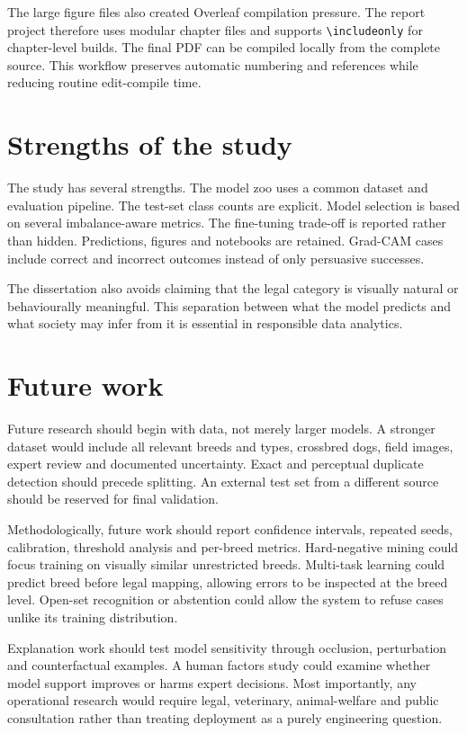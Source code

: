 The large figure files also created Overleaf compilation pressure. The report project therefore uses modular chapter files and supports \texttt{\textbackslash includeonly} for chapter-level builds. The final PDF can be compiled locally from the complete source. This workflow preserves automatic numbering and references while reducing routine edit-compile time.

\section{Strengths of the study}
The study has several strengths. The model zoo uses a common dataset and evaluation pipeline. The test-set class counts are explicit. Model selection is based on several imbalance-aware metrics. The fine-tuning trade-off is reported rather than hidden. Predictions, figures and notebooks are retained. Grad-CAM cases include correct and incorrect outcomes instead of only persuasive successes.

The dissertation also avoids claiming that the legal category is visually natural or behaviourally meaningful. This separation between what the model predicts and what society may infer from it is essential in responsible data analytics.

\section{Future work}
Future research should begin with data, not merely larger models. A stronger dataset would include all relevant breeds and types, crossbred dogs, field images, expert review and documented uncertainty. Exact and perceptual duplicate detection should precede splitting. An external test set from a different source should be reserved for final validation.

Methodologically, future work should report confidence intervals, repeated seeds, calibration, threshold analysis and per-breed metrics. Hard-negative mining could focus training on visually similar unrestricted breeds. Multi-task learning could predict breed before legal mapping, allowing errors to be inspected at the breed level. Open-set recognition or abstention could allow the system to refuse cases unlike its training distribution.

Explanation work should test model sensitivity through occlusion, perturbation and counterfactual examples. A human factors study could examine whether model support improves or harms expert decisions. Most importantly, any operational research would require legal, veterinary, animal-welfare and public consultation rather than treating deployment as a purely engineering question.

